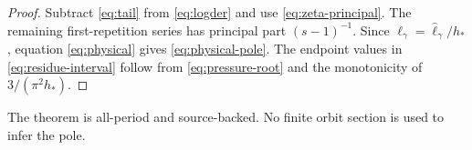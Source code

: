 \begin{proof}
Subtract \eqref{eq:tail} from \eqref{eq:logder} and use
\eqref{eq:zeta-principal}.  The remaining first-repetition series has
principal part \((s-1)^{-1}\).  Since
\(\ell_\gamma=\widehat\ell_\gamma/h_*\), equation
\eqref{eq:physical} gives \eqref{eq:physical-pole}.  The endpoint values in
\eqref{eq:residue-interval} follow from \eqref{eq:pressure-root} and the
monotonicity of \(3/(\pi^2h_*)\).
\end{proof}

The theorem is all-period and source-backed.  No finite orbit section is used
to infer the pole.
